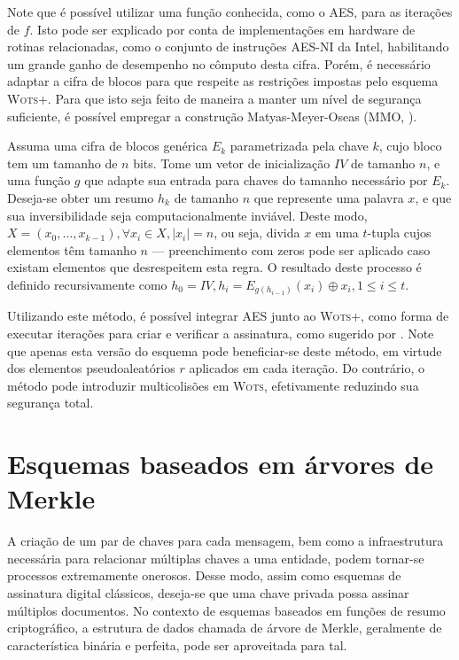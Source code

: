 \documentclass[12pt]{report}
\begin{document}
Note que é possível utilizar uma função conhecida, como o AES, para as iterações de $f$. Isto pode ser explicado por conta de implementações em hardware de rotinas relacionadas, como o conjunto de instruções AES-NI da Intel, habilitando um grande ganho de desempenho no cômputo desta cifra. Porém, é necessário adaptar a cifra de blocos para que respeite as restrições impostas pelo esquema \textsc{Wots+}. Para que isto seja feito de maneira a manter um nível de segurança suficiente, é possível empregar a construção Matyas-Meyer-Oseas (MMO, \cite[9.41]{Menezes:1996:HAC:548089}).

Assuma uma cifra de blocos genérica $E_{k}$ parametrizada pela chave $k$, cujo bloco tem um tamanho de $n$ bits. Tome um vetor de inicialização $IV$ de tamanho $n$, e uma função $g$ que adapte sua entrada para chaves do tamanho necessário por $E_{k}$. Deseja-se obter um resumo $h_k$ de tamanho $n$ que represente uma palavra $x$, e que sua inversibilidade seja computacionalmente inviável. Deste modo, $X = (x_0, \dots, x_{k - 1}), \forall x_i \in X, \vert x_i \vert = n$, ou seja, divida $x$ em uma $t$-tupla cujos elementos têm tamanho $n$ --- preenchimento com zeros pode ser aplicado caso existam elementos que desrespeitem esta regra. O resultado deste processo é definido recursivamente como $h_0 = IV, h_i = E_{g(h_{i-1})}(x_i) \oplus x_i, 1 \leq i \leq t$.

Utilizando este método, é possível integrar AES junto ao \textsc{Wots+}, como forma de executar iterações para criar e verificar a assinatura, como sugerido por \cite[4.1]{cryptoeprint:2017:965}. Note que apenas esta versão do esquema pode beneficiar-se deste método, em virtude dos elementos pseudoaleatórios $r$ aplicados em cada iteração. Do contrário, o método pode introduzir multicolisões em \textsc{Wots}, efetivamente reduzindo sua segurança total. %

\section{Esquemas baseados em árvores de Merkle}

A criação de um par de chaves para cada mensagem, bem como a infraestrutura necessária para relacionar múltiplas chaves a uma entidade, podem tornar-se processos extremamente onerosos. Desse modo, assim como esquemas de assinatura digital clássicos, deseja-se que uma chave privada possa assinar múltiplos documentos. No contexto de esquemas baseados em funções de resumo criptográfico, a estrutura de dados chamada de árvore de Merkle, geralmente de característica binária e perfeita, pode ser aproveitada para tal.
\end{document}
